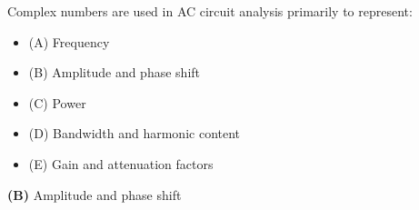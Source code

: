 

Complex numbers are used in AC circuit analysis primarily to represent:

\begin{itemize}
\item{(A)} Frequency
\vskip 5pt 
\item{(B)} Amplitude and phase shift
\vskip 5pt 
\item{(C)} Power
\vskip 5pt 
\item{(D)} Bandwidth and harmonic content
\vskip 5pt 
\item{(E)} Gain and attenuation factors
\end{itemize}







{\bf (B)} Amplitude and phase shift
 










